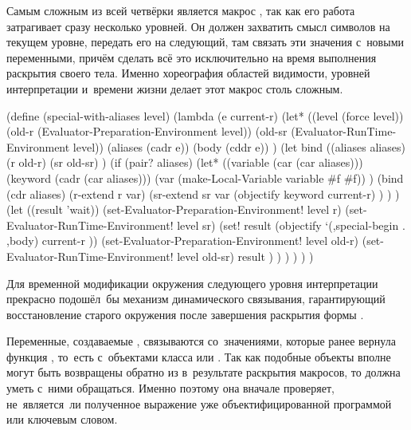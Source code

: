 Самым сложным из всей четвёрки является макрос , так как его
работа затрагивает сразу несколько уровней. Он должен захватить смысл символов
на текущем уровне, передать его на следующий, там связать эти значения с~новыми
переменными, причём сделать всё это исключительно на время выполнения раскрытия
своего тела. Именно хореография областей видимости, уровней интерпретации
и~времени жизни делает этот макрос столь сложным.

\begin{code:lisp}
(define (special-with-aliases level)
  (lambda (e current-r)
    (let* ((level   (force level))
           (old-r   (Evaluator-Preparation-Environment level))
           (old-sr  (Evaluator-RunTime-Environment level))
           (aliases (cadr e))
           (body    (cddr e)) )
      (let bind ((aliases aliases)
                 (r  old-r)
                 (sr old-sr) )
        (if (pair? aliases)
            (let* ((variable (car (car aliases)))
                   (keyword  (cadr (car aliases)))
                   (var      (make-Local-Variable variable #f #f)) )
              (bind (cdr aliases)
                    (r-extend r var)
                    (sr-extend sr var
                               (objectify keyword current-r) ) ) )
            (let ((result 'wait))
              (set-Evaluator-Preparation-Environment! level r)
              (set-Evaluator-RunTime-Environment! level sr)
              (set! result (objectify `(,special-begin . ,body)
                                      current-r ))
              (set-Evaluator-Preparation-Environment! level old-r)
              (set-Evaluator-RunTime-Environment! level old-sr)
              result ) ) ) ) ) )
\end{code:lisp}

Для временной модификации окружения следующего уровня интерпретации прекрасно
подошёл~бы механизм динамического связывания, гарантирующий восстановление
старого окружения после завершения раскрытия формы .

Переменные, создаваемые , связываются со~значениями, которые
ранее вернула функция , то~есть с~объектами класса 
или . Так как подобные объекты вполне могут быть возвращены
обратно из  в~результате раскрытия макросов, то 
должна уметь с~ними обращаться. Именно поэтому она вначале проверяет,
не~является~ли полученное выражение уже объектифицированной программой или
ключевым словом. 


